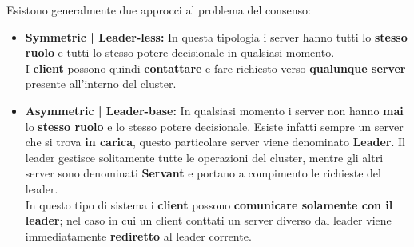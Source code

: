 Esistono generalmente due approcci al problema del consenso:
\begin{itemize}
  \item{\textbf{Symmetric | Leader-less:}}
  In questa tipologia i server hanno tutti lo \textbf{stesso ruolo} e tutti lo stesso potere decisionale in qualsiasi momento.\\
  I \textbf{client} possono quindi \textbf{contattare} e fare richiesto verso \textbf{qualunque server} presente all'interno del cluster. 
  \item{\textbf{Asymmetric | Leader-base:}}
  In qualsiasi momento i server non hanno \textbf{mai} lo \textbf{stesso ruolo} e lo stesso potere decisionale. Esiste infatti sempre un server che si trova \textbf{in carica}, questo particolare server viene denominato \textbf{Leader}. Il leader gestisce solitamente tutte le operazioni del cluster, mentre gli altri server sono denominati \textbf{Servant} e portano a compimento le richieste del leader.\\
  In questo tipo di sistema i \textbf{client} possono \textbf{comunicare solamente con il leader}; nel caso in cui un client conttati un server diverso dal leader viene immediatamente \textbf{rediretto} al leader corrente.
\end{itemize}